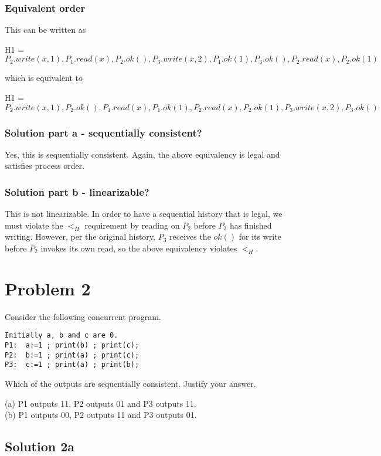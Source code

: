 \documentclass{article}
\begin{document}
\subsubsection{Equivalent order}
This can be written as

H1 = $P_2.write(x, 1), P_1.read(x), P_2.ok(), P_3.write(x, 2), P_1.ok(1), P_3.ok(), P_2.read(x), P_2.ok(1)$

which is equivalent to 

H1 = $P_2.write(x, 1), P_2.ok(), P_1.read(x), P_1.ok(1), P_2.read(x), P_2.ok(1), P_3.write(x, 2), P_3.ok()$

\subsubsection{Solution part a - sequentially consistent?}
Yes, this is sequentially consistent. Again, the above equivalency is legal and satisfies process order.
\subsubsection{Solution part b - linearizable?}
This is not linearizable. In order to have a sequential history that is legal, we must violate the $<_H$ requirement by reading on $P_2$ before $P_3$ has finished writing. However, per the original history, $P_3$ receives the $ok()$ for its write before $P_2$ invokes its own read, so the above equivalency violates $<_H$.

\pagebreak
\section{Problem 2}
Consider the following concurrent program.
\begin{verbatim}
Initially a, b and c are 0.
P1:  a:=1 ; print(b) ; print(c);
P2:  b:=1 ; print(a) ; print(c);
P3:  c:=1 ; print(a) ; print(b);
\end{verbatim}

Which of the outputs are sequentially consistent. Justify your answer.

(a) P1 outputs 11, P2 outputs 01 and P3 outputs 11.\\

(b) P1 outputs 00, P2 outputs 11 and P3 outputs 01.


\subsection{Solution 2a}
\end{document}
